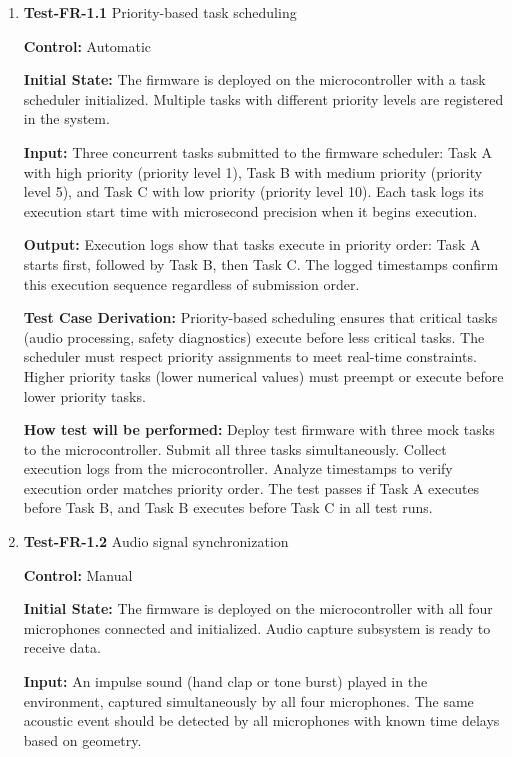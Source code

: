 \documentclass[12pt, titlepage]{article}
\begin{document}
\begin{enumerate}

\item{\textbf{Test-FR-1.1} Priority-based task scheduling \\}

\textbf{Control:} Automatic
					
\textbf{Initial State:} 
The firmware is deployed on the microcontroller with a task scheduler
initialized. Multiple tasks with different priority levels are registered in the
system.
					
\textbf{Input:}
Three concurrent tasks submitted to the firmware scheduler: Task A with high
priority (priority level 1), Task B with medium priority (priority level 5), and
Task C with low priority (priority level 10). Each task logs its execution start
time with microsecond precision when it begins execution.
					
\textbf{Output:}
Execution logs show that tasks execute in priority order: Task A starts first,
followed by Task B, then Task C. The logged timestamps confirm this execution
sequence regardless of submission order.

\textbf{Test Case Derivation:} 
Priority-based scheduling ensures that critical tasks (audio processing, safety
diagnostics) execute before less critical tasks. The scheduler must respect
priority assignments to meet real-time constraints. Higher priority tasks (lower
numerical values) must preempt or execute before lower priority tasks.
					
\textbf{How test will be performed:}
Deploy test firmware with three mock tasks to the microcontroller. Submit all
three tasks simultaneously. Collect execution logs from the microcontroller.
Analyze timestamps to verify execution order matches priority order. The test
passes if Task A executes before Task B, and Task B executes before Task C in
all test runs.

\item{\textbf{Test-FR-1.2} Audio signal synchronization\\}

\textbf{Control:} Manual
					
\textbf{Initial State:} 
The firmware is deployed on the microcontroller with all four microphones
connected and initialized. Audio capture subsystem is ready to receive data.
					
\textbf{Input:}
An impulse sound (hand clap or tone burst) played in the environment, captured
simultaneously by all four microphones. The same acoustic event should be
detected by all microphones with known time delays based on geometry.
					

\end{enumerate}
\end{document}
